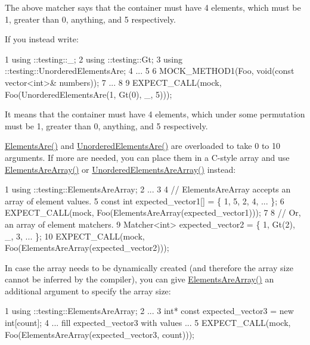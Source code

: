 The above matcher says that the container must have 4 elements, which must be 1, greater than 0, anything, and 5 respectively.

If you instead write\+:


\begin{DoxyCode}
1 using ::testing::\_;
2 using ::testing::Gt;
3 using ::testing::UnorderedElementsAre;
4 ...
5 
6   MOCK\_METHOD1(Foo, void(const vector<int>& numbers));
7 ...
8 
9   EXPECT\_CALL(mock, Foo(UnorderedElementsAre(1, Gt(0), \_, 5)));
\end{DoxyCode}


It means that the container must have 4 elements, which under some permutation must be 1, greater than 0, anything, and 5 respectively.

{\ttfamily \hyperlink{namespacetesting_a79cf4ae694bf8231dcf283b325405f27}{Elements\+Are()}} and {\ttfamily \hyperlink{namespacetesting_a8622c12aadfa0e60f7d68683eeb21115}{Unordered\+Elements\+Are()}} are overloaded to take 0 to 10 arguments. If more are needed, you can place them in a C-\/style array and use {\ttfamily \hyperlink{namespacetesting_ae2eee06e7ddbf5f5372fd24372e9703f}{Elements\+Are\+Array()}} or {\ttfamily \hyperlink{namespacetesting_ab4896081406209171a1596b7028e1cf7}{Unordered\+Elements\+Are\+Array()}} instead\+:


\begin{DoxyCode}
1 using ::testing::ElementsAreArray;
2 ...
3 
4   // ElementsAreArray accepts an array of element values.
5   const int expected\_vector1[] = \{ 1, 5, 2, 4, ... \};
6   EXPECT\_CALL(mock, Foo(ElementsAreArray(expected\_vector1)));
7 
8   // Or, an array of element matchers.
9   Matcher<int> expected\_vector2 = \{ 1, Gt(2), \_, 3, ... \};
10   EXPECT\_CALL(mock, Foo(ElementsAreArray(expected\_vector2)));
\end{DoxyCode}


In case the array needs to be dynamically created (and therefore the array size cannot be inferred by the compiler), you can give {\ttfamily \hyperlink{namespacetesting_ae2eee06e7ddbf5f5372fd24372e9703f}{Elements\+Are\+Array()}} an additional argument to specify the array size\+:


\begin{DoxyCode}
1 using ::testing::ElementsAreArray;
2 ...
3   int* const expected\_vector3 = new int[count];
4   ... fill expected\_vector3 with values ...
5   EXPECT\_CALL(mock, Foo(ElementsAreArray(expected\_vector3, count)));
\end{DoxyCode}


